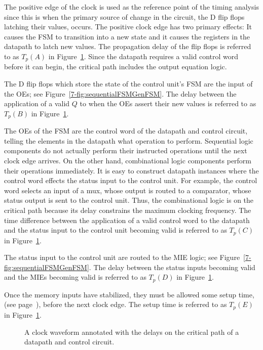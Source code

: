 The positive edge of the clock is used as the reference point
of the timing analysis since this is when the primary source of change
in the circuit, the D flip flops latching their values, occurs.
The positive clock edge has two primary effects: It causes the
FSM to transition into a new state and it causes the registers in
the datapath to latch new values.  The propagation delay of the
flip flops is referred to as $T_p(A)$ in Figure~\ref{fig:datapathControlDPTime}.  Since
the datapath requires a valid control word before it can begin,
the critical path includes the output equation logic.

The D flip flops which store the state of the control unit's FSM
are the input of the OEs; see Figure~\ref{7-fig:sequentialFSMGenFSM}.  The delay
between the application of a valid $Q$ to when the OEs assert their new
values is referred to as $T_p(B)$ in Figure~\ref{fig:datapathControlDPTime}.

The OEs of the FSM are the control word of the datapath and
control circuit, telling the elements in the datapath what operation
to perform.  Sequential logic components do not actually
perform their instructed operations until the next clock edge
arrives.  On the other hand, combinational logic components
perform their operations immediately.  It is easy to construct
datapath instances where the control word effects the status
input to the control unit.  For example, the control word
selects an input of a mux, whose output is routed to a comparator,
whose status output is sent to the control unit.  Thus, the
combinational logic is on the critical path because its delay
constrains the maximum clocking frequency.  The time difference
between the application of a valid control word to the datapath
and the status input to the control unit becoming valid is referred
to as $T_p(C)$ in Figure~\ref{fig:datapathControlDPTime}.

The status input to the control unit are routed to the MIE logic;
see Figure~\ref{7-fig:sequentialFSMGenFSM}.  The delay between the status inputs
becoming valid and the MIEs becoming valid is referred to as $T_p(D)$
in Figure~\ref{fig:datapathControlDPTime}.

Once the memory inputs have stabilized, they must be allowed
some setup time, (see page~\pageref{page:setup}), before the next
clock edge.  The setup time is referred to as $T_p(E)$ in
Figure~\ref{fig:datapathControlDPTime}.

\begin{figure}[ht]
    \caption{A clock waveform annotated with the delays on the
    critical path of a datapath and control circuit.}
    \label{fig:datapathControlDPTime}
\end{figure}

